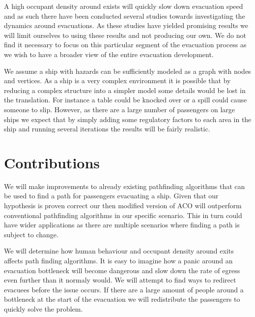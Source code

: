 A high occupant density around exists will quickly slow down evacuation speed and as such there have been conducted several studies
towards investigating the dynamics around evacuations. As these studies have yielded promising results we will
limit ourselves to using these results and not producing our own. We do not find it necessary to focus on this particular segment 
of the evacuation process as we wish to have a broader view of the entire evacuation development.

We assume a ship with hazards can be sufficiently modeled as a graph with nodes and vertices. As a ship is a very complex
environment it is possible that by reducing a complex structure into a simpler model some details would be lost in the
translation. For instance a table could be knocked over or a spill could cause someone to slip. However, as there are a large number of 
passengers on large ships we expect that by simply adding some regulatory factors to each area in the ship and running
several iterations the results will be fairly realistic.                                                           %

\section{Contributions}

 We will make improvements to already existing pathfinding algorithms that can be used to find a path 
for passengers evacuating a ship. Given that our hypothesis is proven
correct our then modified version of ACO will outperform conventional pathfinding algorithms in our 
specific scenario. This in turn could have wider applications as there are multiple scenarios
where finding a path is subject to change. 

We will determine how human behaviour and occupant density around exits affects path finding algorithms.
It is easy to imagine how a panic around an evacuation bottleneck will become dangerous and slow
down the rate of egress even further than it normaly would. We will attempt to find ways to redirect
evacuees before the issue occurs. If there are a large amount of people around a bottleneck at the
start of the evacuation we will redistribute the passengers to quickly solve the problem.


